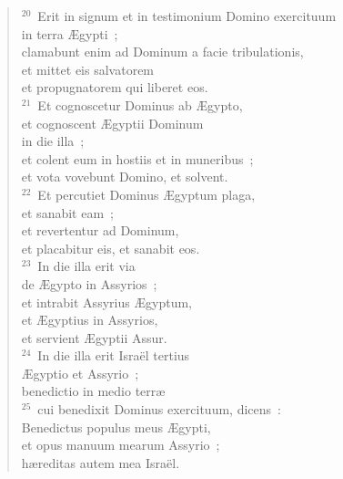 \begin{flushleft}
\begin{verse}
${}^{20}$~Erit in signum et in testimonium Domino exercituum\\ in terra \AE gypti~;\\ clamabunt enim ad Dominum a facie tribulationis,\\ et mittet eis salvatorem\\ et propugnatorem qui liberet eos.\\
${}^{21}$~Et cognoscetur Dominus ab \AE gypto,\\ et cognoscent \AE gyptii Dominum\\ in die illa~;\\ et colent eum in hostiis et in muneribus~;\\ et vota vovebunt Domino, et solvent.\\
${}^{22}$~Et percutiet Dominus \AE gyptum plaga,\\ et sanabit eam~;\\ et revertentur ad Dominum,\\ et placabitur eis, et sanabit eos.\\
${}^{23}$~In die illa erit via\\ de \AE gypto in Assyrios~;\\ et intrabit Assyrius \AE gyptum,\\ et \AE gyptius in Assyrios,\\ et servient \AE gyptii Assur.\\
${}^{24}$~In die illa erit Isra\"el tertius\\ \AE gyptio et Assyrio~;\\ benedictio in medio terr\ae \\
${}^{25}$~cui benedixit Dominus exercituum, dicens~:\\ Benedictus populus meus \AE gypti,\\ et opus manuum mearum Assyrio~;\\ h\ae reditas autem mea Isra\"el.\end{verse}\end{flushleft}


